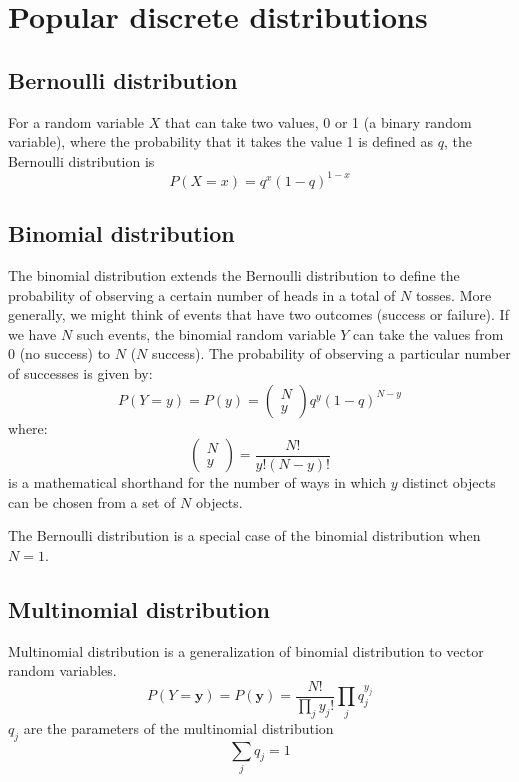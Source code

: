 \documentclass[a4paper,11pt]{article} %
\begin{document}
\section{Popular discrete distributions}

\subsection{Bernoulli distribution}

For a random variable $X$ that can take two values, 0 or 1 (a binary random variable),
where the probability that it takes the value 1 is defined as $q$, the Bernoulli distribution
is
\begin{equation}
P(X=x) = q^{x} (1 - q)^{1-x}
\end{equation}


\subsection{Binomial distribution}

The binomial distribution extends the Bernoulli distribution to define the probability
of observing a certain number of heads in a total of $N$ tosses. More generally, we
might think of events that have two outcomes (success or failure). If we have $N$ such
events, the binomial random variable $Y$ can take the values from 0 (no success) to
$N$ ($N$ success). The probability of observing a particular number of successes is given
by:
\begin{equation}
P(Y=y) = P(y) = \begin{pmatrix}N \\ y\end{pmatrix} q^{y} (1-q)^{N-y}
\end{equation}
where:
\begin{equation}
\begin{pmatrix}N \\ y \end{pmatrix} = \frac{N!}{y!(N-y)!}
\end{equation}
is a mathematical shorthand for the number of ways in which $y$ distinct objects can
be chosen from a set of $N$ objects.

The Bernoulli distribution is a special case of the binomial distribution when $N=1$.

\subsection{Multinomial distribution}
Multinomial distribution is a generalization of binomial distribution to vector
random variables.
\begin{equation}
P(Y=\mathbf{y}) = P(\mathbf{y}) = \frac{N!}{\prod_{j}y_{j}!}\prod_{j} q_{j}^{y_{j}}
\end{equation}
$q_{j}$ are the parameters of the multinomial distribution
\begin{equation*}
\sum_{j} q_{j} = 1
\end{equation*}
\end{document}
